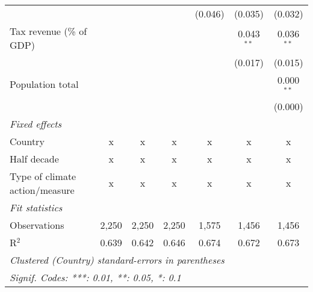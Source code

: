 \begin{tabular}{lcccccc}
                                                           &         &                &                & (0.046)        & (0.035)        & (0.032)\\   
   Tax revenue (\% of GDP)                                 &         &                &                &                & 0.043$^{**}$   & 0.036$^{**}$\\   
                                                           &         &                &                &                & (0.017)        & (0.015)\\   
   Population total                                        &         &                &                &                &                & 0.000$^{**}$\\   
                                                           &         &                &                &                &                & (0.000)\\   
   \emph{Fixed effects}\\
   Country                                                 & x       & x              & x              & x              & x              & x\\  
   Half decade                                             & x       & x              & x              & x              & x              & x\\  
   Type of climate action/measure                          & x       & x              & x              & x              & x              & x\\  
   \midrule \emph{Fit statistics}\\
   Observations                                            & 2,250   & 2,250          & 2,250          & 1,575          & 1,456          & 1,456\\  
   R$^2$                                                   & 0.639   & 0.642          & 0.646          & 0.674          & 0.672          & 0.673\\  
   \midrule
   \multicolumn{7}{l}{\emph{Clustered (Country) standard-errors in parentheses}}\\
   \multicolumn{7}{l}{\emph{Signif. Codes: ***: 0.01, **: 0.05, *: 0.1}}\\
\end{tabular}
\par\endgroup


